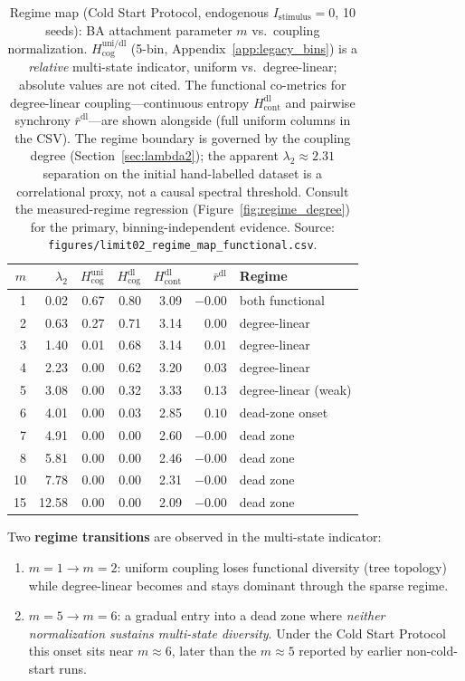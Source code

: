 ﻿\documentclass[11pt]{article}
\begin{document}
\begin{table}[ht]
\centering
\caption{Regime map (Cold Start Protocol, endogenous $I_{\text{stimulus}}=0$, 10 seeds): BA attachment parameter $m$ vs.\ coupling normalization. $H_{\text{cog}}^{\text{uni/dl}}$ (5-bin, Appendix~\ref{app:legacy_bins}) is a \emph{relative} multi-state indicator, uniform vs.\ degree-linear; absolute values are not cited. The functional co-metrics for degree-linear coupling---continuous entropy $H_{\text{cont}}^{\text{dl}}$ and pairwise synchrony $\bar{r}^{\text{dl}}$---are shown alongside (full uniform columns in the CSV). The regime boundary is governed by the coupling degree (Section~\ref{sec:lambda2}); the apparent $\lambda_2 \approx 2.31$ separation on the initial hand-labelled dataset is a correlational proxy, not a causal spectral threshold. Consult the measured-regime regression (Figure~\ref{fig:regime_degree}) for the primary, binning-independent evidence. Source: \texttt{figures/limit02\_regime\_map\_functional.csv}.}
\label{tab:ba_m_sweep}
\begin{tabular}{rrrrrrl}
\toprule
$m$ & $\lambda_2$ & $H_{\text{cog}}^{\text{uni}}$ & $H_{\text{cog}}^{\text{dl}}$ & $H_{\text{cont}}^{\text{dl}}$ & $\bar{r}^{\text{dl}}$ & Regime \\
\midrule
1  & 0.02  & 0.67 & 0.80 & 3.09 & $-0.00$ & both functional \\
2  & 0.63  & 0.27 & 0.71 & 3.14 & $0.00$  & degree-linear \\
3  & 1.40  & 0.01 & 0.68 & 3.14 & $0.01$  & degree-linear \\
4  & 2.23  & 0.00 & 0.62 & 3.20 & $0.03$  & degree-linear \\
5  & 3.08  & 0.00 & 0.32 & 3.33 & $0.13$  & degree-linear (weak) \\
6  & 4.01  & 0.00 & 0.03 & 2.85 & $0.10$  & dead-zone onset \\
7  & 4.91  & 0.00 & 0.00 & 2.60 & $-0.00$ & dead zone \\
8  & 5.81  & 0.00 & 0.00 & 2.46 & $-0.00$ & dead zone \\
10 & 7.78  & 0.00 & 0.00 & 2.31 & $-0.00$ & dead zone \\
15 & 12.58 & 0.00 & 0.00 & 2.09 & $-0.00$ & dead zone \\
\bottomrule
\end{tabular}
\end{table}

Two \textbf{regime transitions} are observed in the multi-state indicator:
\begin{enumerate}
\item $m = 1 \to m = 2$: uniform coupling loses functional diversity (tree topology) while degree-linear becomes and stays dominant through the sparse regime.
\item $m = 5 \to m = 6$: a gradual entry into a dead zone where \emph{neither normalization sustains multi-state diversity}. Under the Cold Start Protocol this onset sits near $m \approx 6$, later than the $m \approx 5$ reported by earlier non-cold-start runs.
\end{enumerate}
\end{document}
